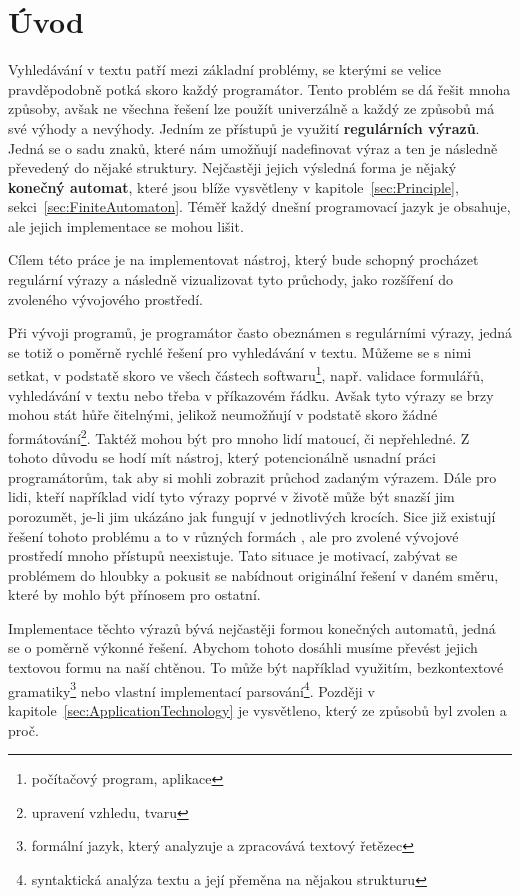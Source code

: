 \chapter{Úvod}\label{sec:Introduction}

Vyhledávání v textu patří mezi základní problémy, se kterými se velice pravděpodobně potká skoro každý programátor. 
Tento problém se dá řešit mnoha způsoby, avšak ne všechna řešení lze použít univerzálně a každý ze způsobů má své výhody a nevýhody.
Jedním ze přístupů je využití \textbf{regulárních výrazů}. 
Jedná se o sadu znaků, které nám umožňují nadefinovat výraz a ten je následně převedený do nějaké struktury. 
Nejčastěji jejich výsledná forma je nějaký \textbf{konečný automat}, které jsou blíže vysvětleny v kapitole~\ref{sec:Principle}, sekci~\ref{sec:FiniteAutomaton}.
Téměř každý dnešní programovací jazyk je obsahuje, ale jejich implementace se mohou lišit.

Cílem této práce je na implementovat nástroj, který bude schopný procházet regulární výrazy a následně vizualizovat tyto průchody, jako rozšíření do zvoleného vývojového prostředí.

Při vývoji programů, je programátor často obeznámen s regulárními výrazy, jedná se totiž o poměrně rychlé řešení pro vyhledávání v textu. 
Můžeme se s nimi setkat, v podstatě skoro ve všech částech softwaru\footnote{počítačový program, aplikace}, např. validace formulářů, vyhledávání v textu nebo třeba v příkazovém řádku.
Avšak tyto výrazy se brzy mohou stát hůře čitelnými, jelikož neumožňují v podstatě skoro žádné formátování\footnote{upravení vzhledu, tvaru}. 
Taktéž mohou být pro mnoho lidí matoucí, či nepřehledné.
Z tohoto důvodu se hodí mít nástroj, který potencionálně usnadní práci programátorům, tak aby si mohli zobrazit průchod zadaným výrazem.
Dále pro lidi, kteří například vidí tyto výrazy poprvé v životě může být snazší jim porozumět, je-li jim ukázáno jak fungují v jednotlivých krocích.
Sice již existují řešení tohoto problému a to v různých formách \cite{Dib, Regexper, RegExr}, ale pro zvolené vývojové prostředí mnoho přístupů neexistuje.
Tato situace je motivací, zabývat se problémem do hloubky a pokusit se nabídnout originální řešení v daném směru, které by mohlo být přínosem pro ostatní.

Implementace těchto výrazů bývá nejčastěji formou konečných automatů, jedná se o poměrně výkonné řešení. 
Abychom tohoto dosáhli musíme převést jejich textovou formu na naší chtěnou.
To může být například využitím, bezkontextové gramatiky\footnote{formální jazyk, který analyzuje a zpracovává textový řetězec} nebo vlastní implementací parsování\footnote{syntaktická analýza textu a její přeměna na nějakou strukturu}.
Později v kapitole~\ref{sec:ApplicationTechnology} je vysvětleno, který ze způsobů byl zvolen a proč.

